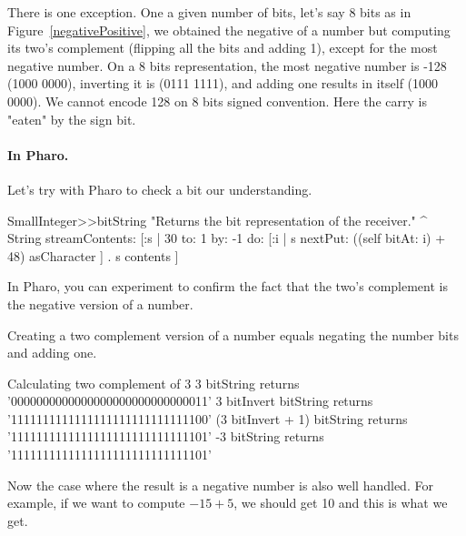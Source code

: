 \documentclass[a4paper,10pt,twoside]{book}
\begin{document}
There is one exception. One a given number of bits, let's say 8 bits as in Figure~\ref{negativePositive},
we obtained the negative of a number but computing its two's complement (flipping all the bits and adding 1), except for the most negative number. On a 8 bits representation, the most negative number is -128 (1000 0000), inverting it is (0111 1111), and adding one results in itself (1000 0000). We cannot encode 128 on 8 bits signed convention. Here the carry is "eaten" by the sign bit. 


\paragraph{In Pharo.}
Let's try with Pharo to check a bit our understanding. 
\begin{code}{}
SmallInteger>>bitString
	"Returns the bit representation of the receiver."
	^ String streamContents: [:s | 
		30 to: 1 by: -1 do: [:i | s nextPut: ((self bitAt: i) + 48) asCharacter ] .
		s contents ]
\end{code}
	
In Pharo, you can experiment to confirm the fact that the two's complement is the negative version of a number.
 
	
	
Creating a two complement version of a number equals negating the number bits and adding one.
\begin{code}{Calculating two complement of 3}
3 bitString 
	returns '0000000000000000000000000000011'
3 bitInvert bitString 
	returns '1111111111111111111111111111100'
(3 bitInvert + 1) bitString 
	returns '1111111111111111111111111111101'
-3 bitString 
	returns '1111111111111111111111111111101'
\end{code}


Now the case where the result is a negative number is also well handled. For example, if we want to compute $-15 + 5$, we should get 10 and this is what we get.
\end{document}
